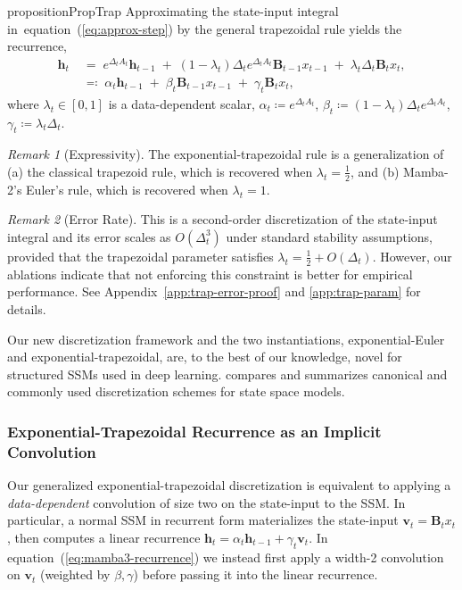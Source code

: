 \documentclass{article}
\def\eqref#1{equation~(\ref{#1})}
\def\vh{{\bm{h}}}
\def\vv{{\bm{v}}}
\def\bB{{\bm{B}}}
\theoremstyle{plain}
\theoremstyle{definition}
\theoremstyle{remark}
\newtheorem{remark}{Remark}
\begin{document}
\begin{restatable}{proposition}{PropTrap}\label{prop:trap}
Approximating the state-input integral in~\eqref{eq:approx-step} by the general trapezoidal rule yields the recurrence,
\begin{align}
    \vh_t 
    \;&=\; 
    e^{\Delta_t A_t} \vh_{t-1} 
    \;+\; (1-\lambda_t)\Delta_t e^{\Delta_t A_t} \bB_{t-1} x_{t-1} 
    \;+\; \lambda_t \Delta_t \bB_t x_t,
    \\
    &\eqqcolon\; 
    \alpha_t \vh_{t-1} 
    \;+\; \beta_t \bB_{t-1} x_{t-1} 
    \;+\; \gamma_t \bB_t x_t,
    \label{eq:mamba3-recurrence}
\end{align}
where $\lambda_t \in [0,1]$ is a data-dependent scalar, $\alpha_t \coloneqq e^{\Delta_t A_t}$, $\beta_t \coloneqq (1-\lambda_t)\Delta_t e^{\Delta_t A_t}$, $\gamma_t \coloneqq \lambda_t \Delta_t$.

\end{restatable}
\begin{remark}[Expressivity]
    The exponential-trapezoidal rule is a generalization of (a) the classical trapezoid rule, which is recovered when $\lambda_t = \tfrac{1}{2}$, and (b) Mamba-2's Euler's rule, which is recovered when $\lambda_t = 1$.
\end{remark}
\begin{remark} [Error Rate]
    This is a second-order discretization of the state-input integral and its error scales as $O(\Delta_t^3)$ 
    under standard stability assumptions, provided that the trapezoidal parameter satisfies $\lambda_t = \tfrac{1}{2} + O(\Delta_t)$.
    However, our ablations indicate that not enforcing this constraint is better for empirical performance. See Appendix~\ref{app:trap-error-proof} and \ref{app:trap-param} for details.
\end{remark}

Our new discretization framework and the two instantiations, exponential-Euler and exponential-trapezoidal, are, to the best of our knowledge, novel for structured SSMs used in deep learning.
 compares and summarizes canonical and commonly used discretization schemes for state space models.

\subsubsection{Exponential-Trapezoidal Recurrence as an Implicit Convolution}

Our generalized exponential-trapezoidal discretization is equivalent to applying a \emph{data-dependent} convolution of size two on the state-input to the SSM.
In particular, a normal SSM in recurrent form materializes the state-input $\vv_t = \bB_tx_t$, then computes a linear recurrence $\vh_t = \alpha_t \vh_{t-1} + \gamma_t \vv_t$. In \eqref{eq:mamba3-recurrence} we instead first apply a width-2 convolution on $\vv_t$ (weighted by $\beta, \gamma$) before passing it into the linear recurrence.
\end{document}
